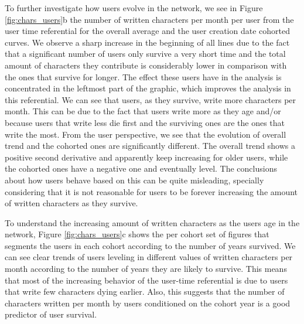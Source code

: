 To further investigate how users evolve in the network, we see in Figure \ref{fig:chars_users}b the number of written characters per month per user from the user time referential for the overall average and the user creation date cohorted curves. We observe a sharp increase in the beginning of all lines due to the fact that a significant number of users only survive a very short time and the total amount of characters they contribute is considerably lower in comparison with the ones that survive for longer. The effect these users have in the analysis is concentrated in the leftmost part of the graphic, which improves the analysis in this referential. We can see that users, as they survive, write more characters per month. This can be due to the fact that users write more as they age and/or because users that write less die first and the surviving ones are the ones that write the most. From the user perspective, we see that the evolution of overall trend and the cohorted ones are significantly different. The overall trend shows a positive second derivative and apparently keep increasing for older users, while the cohorted ones have a negative one and eventually level. The conclusions about how users behave based on this can be quite misleading, specially considering that it is not reasonable for users to be forever increasing the amount of written characters as they survive.

To understand the increasing amount of written characters as the users age in the network, Figure \ref{fig:chars_users}c shows the per cohort set of figures that segments the users in each cohort according to the number of years survived. We can see clear trends of users leveling in different values of written characters per month according to the number of years they are likely to survive. This means that most of the increasing behavior of the user-time referential is due to users that write few characters dying earlier. Also, this suggests that the number of characters written per month by users conditioned on the cohort year is a good predictor of user survival.
